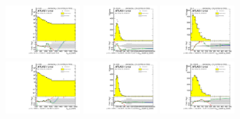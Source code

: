 \begin{figure}[htbp!]
\begin{center}
\includegraphics[width=0.25\textwidth,angle=-90]{figures/boosted/Reweight/Fits/Moriond_NoTag_4Trk_subl_Incl_leadHCand_Pt_m_1.pdf}
\includegraphics[width=0.25\textwidth,angle=-90]{figures/boosted/Reweight/Fits/Moriond_NoTag_4Trk_subl_Incl_leadHCand_trk0_Pt.pdf}
\includegraphics[width=0.25\textwidth,angle=-90]{figures/boosted/Reweight/Fits/Moriond_NoTag_4Trk_subl_Incl_leadHCand_trk1_Pt.pdf} \\
\includegraphics[width=0.25\textwidth,angle=-90]{figures/boosted/Reweight/Fits/Moriond_bkg_0_NoTag_4Trk_subl_Incl_leadHCand_Pt_m_1.pdf}
\includegraphics[width=0.25\textwidth,angle=-90]{figures/boosted/Reweight/Fits/Moriond_bkg_0_NoTag_4Trk_subl_Incl_leadHCand_trk0_Pt.pdf}
\includegraphics[width=0.25\textwidth,angle=-90]{figures/boosted/Reweight/Fits/Moriond_bkg_0_NoTag_4Trk_subl_Incl_leadHCand_trk1_Pt.pdf} \\

\end{center}
\end{figure}

